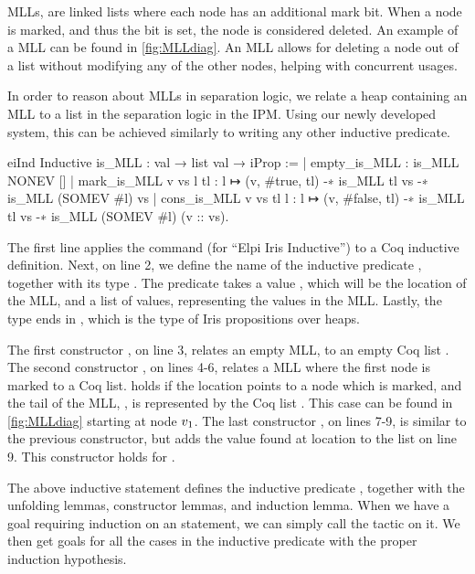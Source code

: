 \documentclass[thesis.tex]{subfiles}
\begin{document}
MLLs, are linked lists where each node has an additional mark bit. When a node is marked, and thus the bit is set, the node is considered deleted. An example of a MLL can be found in \cref{fig:MLLdiag}. An MLL allows for deleting a node out of a list without modifying any of the other nodes, helping with concurrent usages.

In order to reason about MLLs in separation logic, we relate a heap containing an MLL to a list in the separation logic in the IPM. Using our newly developed system, this can be achieved similarly to writing any other inductive predicate.
\begin{coqcode}
  eiInd
  Inductive is_MLL : val → list val → iProp :=
      | empty_is_MLL : is_MLL NONEV []
      | mark_is_MLL v vs l tl : 
        l ↦ (v, #true, tl) -∗ is_MLL tl vs -∗ 
        is_MLL (SOMEV #l) vs
      | cons_is_MLL v vs tl l : 
        l ↦ (v, #false, tl) -∗ is_MLL tl vs -∗ 
        is_MLL (SOMEV #l) (v :: vs).
\end{coqcode}
The first line applies the command  (for ``Elpi Iris Inductive'') to a Coq inductive definition. Next, on line 2, we define the name of the inductive predicate , together with its type . The predicate takes a value , which will be the location of the MLL, and a list of values, representing the values in the MLL. Lastly, the type ends in , which is the type of Iris propositions over heaps.

The first constructor , on line 3, relates an empty MLL,  to an empty Coq list \coqi{[]}. The second constructor , on lines 4-6, relates a MLL where the first node is marked to a Coq list.  holds if the location  points to a node which is marked, and the tail of the MLL, , is represented by the Coq list . This case can be found in \cref{fig:MLLdiag} starting at node $v_1$. The last constructor , on lines 7-9, is similar to the previous constructor, but adds the value found at location  to the list on line 9. This constructor holds for .

The above inductive statement defines the inductive predicate , together with the unfolding lemmas, constructor lemmas, and induction lemma. When we have a goal requiring induction on an  statement, we can simply call the  tactic on it. We then get goals for all the cases in the inductive predicate with the proper induction hypothesis.
\end{document}
